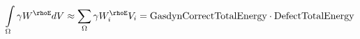 \documentclass{minimal}
\begin{document}
 \begin{align*}
\int \limits_{\Omega} \gamma W^{\rhoE} dV \approx \sum \limits_{\Omega} \gamma W^{\rhoE}_i V_i = \text{GasdynCorrectTotalEnergy} \cdot \text{DefectTotalEnergy}
 \end{align*}
 
\end{document}
